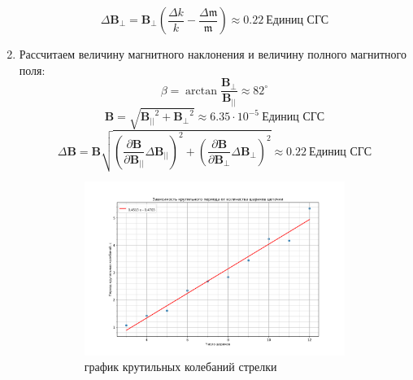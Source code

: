 \documentclass[a4paper, 12pt]{article}
\begin{document}
\begin{enumerate}
\begin{equation*}
    \end{equation*}
    \begin{equation*}
        \Delta \mathbf{B_{\perp}} = \mathbf{B_{\perp}}\left(\frac{\Delta k}{k} - \frac{\Delta \mathfrak{m}}{\mathfrak{m}}\right) \approx 0.22\ \text{Единиц СГС}
    \end{equation*}
    \item Рассчитаем величину магнитного наклонения и величину полного магнитного поля:
    \begin{equation*}
            \beta = \arctan{\frac{\mathbf{B_{\perp}}}{\mathbf{B_{||}}}} \approx 82^\circ
    \end{equation*}
    \begin{equation*}
        \mathbf{B} = \sqrt{\mathbf{B_{||}}^{2} + \mathbf{B_{\perp}}^{2}} \approx 6.35\cdot 10^{-5}\ \text{Единиц СГС}
    \end{equation*}
    \begin{equation*}
        \Delta \mathbf{B} = \mathbf{B}\sqrt{\left(\frac{\partial \mathbf{B}}{\partial \mathbf{B_{||}}}\Delta \mathbf{B_{||}}\right)^{2} + \left(\frac{\partial \mathbf{B}}{\partial \mathbf{B_{\perp}}}\Delta \mathbf{B_{\perp}}\right)^{2}} \approx 0.22\ \text{Единиц СГС}
    \end{equation*}
    \begin{figure}[htbp]
        \centering
        \begin{subfigure}{0.8\textwidth}
            \centering
            \includegraphics[width=\linewidth]{period.png}
            \caption{график крутильных колебаний стрелки}
            \label{горизонтальная составляющая}
        \end{subfigure}
        \hfill
        \begin{subfigure}{0.8\textwidth}

\end{subfigure}
\end{figure}
\end{enumerate}
\end{document}
